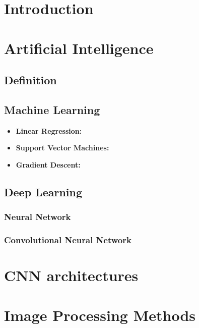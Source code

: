 \section{Introduction}
\vspace{0.2in}
\hspace*{0.16in}

\section{Artificial Intelligence}
\subsection{Definition}

\subsection{Machine Learning}

\begin{itemize}
  \item \textbf{Linear Regression:}
  \item \textbf{Support Vector Machines:}
  \item \textbf{Gradient Descent:}
\end{itemize}

\subsection{Deep Learning}
\subsubsection{Neural Network}
\subsubsection{Convolutional Neural Network}

\section{CNN architectures}
\vspace{0.2in}
\hspace*{0.16in}

\section{Image Processing Methods}
\vspace{0.2in}
\hspace*{0.16in}
